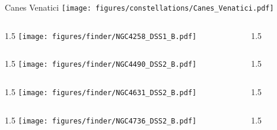 \documentclass[final]{beamer}
\newlength{\colwidth}
\begin{document}

\begin{frame}[t]{\LARGE Canes Venatici}
    \centering
    \texttt{[image: figures/constellations/Canes\_Venatici.pdf]}
\end{frame}


\begin{frame}[t]{}
    \begin{columns}[T]
        \begin{column}{1.5\colwidth}
            \centering
            \texttt{[image: figures/finder/NGC4258\_DSS1\_B.pdf]}
        \end{column}
        \begin{column}{1.5\colwidth}
            \Large
            
        \end{column}
    \end{columns}
    \vspace{\fill}
    \begin{columns}[T]
        \begin{column}{1.5\colwidth}
            \centering
            \texttt{[image: figures/finder/NGC4490\_DSS2\_B.pdf]}
        \end{column}
        \begin{column}{1.5\colwidth}
            \Large
            
        \end{column}
    \end{columns}
\end{frame}


\begin{frame}[t]{}
    \begin{columns}[T]
        \begin{column}{1.5\colwidth}
            \centering
            \texttt{[image: figures/finder/NGC4631\_DSS2\_B.pdf]}
        \end{column}
        \begin{column}{1.5\colwidth}
            \Large
            
        \end{column}
    \end{columns}
    \vspace{\fill}
    \begin{columns}[T]
        \begin{column}{1.5\colwidth}
            \centering
            \texttt{[image: figures/finder/NGC4736\_DSS2\_B.pdf]}
        \end{column}
        \begin{column}{1.5\colwidth}
            \Large
            
        \end{column}
    \end{columns}
\end{frame}
\end{document}
